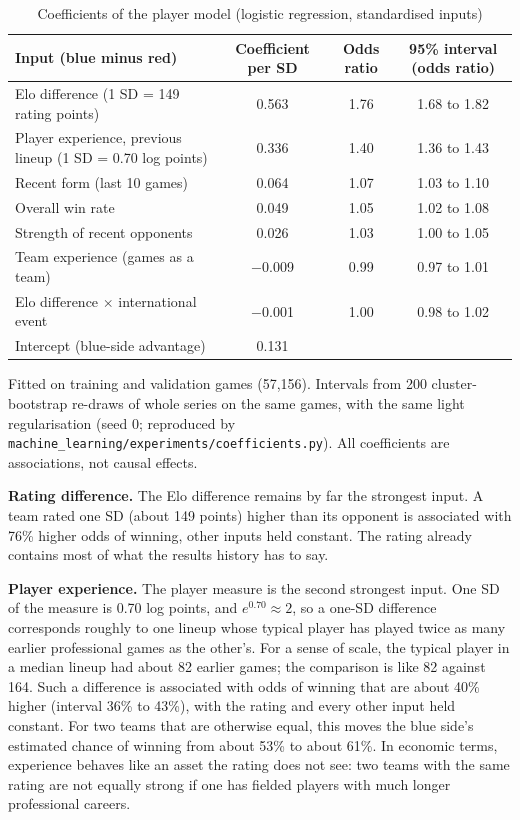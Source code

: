 \documentclass[12pt,a4paper]{article}
\begin{document}
\begin{table}[H]
\centering\small
\begin{threeparttable}
\caption{Coefficients of the player model (logistic regression, standardised inputs)}\label{tab:coef}
\begin{tabularx}{\linewidth}{@{}Yccc@{}}
\toprule
Input (blue minus red) & Coefficient per SD & Odds ratio & 95\% interval (odds ratio) \\
\midrule
Elo difference (1 SD = 149 rating points) & 0.563 & 1.76 & 1.68 to 1.82 \\
Player experience, previous lineup (1 SD = 0.70 log points) & 0.336 & 1.40 & 1.36 to 1.43 \\
Recent form (last 10 games) & 0.064 & 1.07 & 1.03 to 1.10 \\
Overall win rate & 0.049 & 1.05 & 1.02 to 1.08 \\
Strength of recent opponents & 0.026 & 1.03 & 1.00 to 1.05 \\
Team experience (games as a team) & $-$0.009 & 0.99 & 0.97 to 1.01 \\
Elo difference $\times$ international event & $-$0.001 & 1.00 & 0.98 to 1.02 \\
\midrule
Intercept (blue-side advantage) & 0.131 & & \\
\bottomrule
\end{tabularx}
\begin{tablenotes}\footnotesize
\item Fitted on training and validation games (57,156). Intervals from 200 cluster-bootstrap re-draws of whole series on the same games, with the same light regularisation (seed 0; reproduced by \texttt{machine\_learning/experiments/coefficients.py}). All coefficients are associations, not causal effects.
\end{tablenotes}
\end{threeparttable}
\end{table}

\textbf{Rating difference.} The Elo difference remains by far the strongest input. A team rated one SD (about 149 points) higher than its opponent is associated with 76\% higher odds of winning, other inputs held constant. The rating already contains most of what the results history has to say.

\textbf{Player experience.} The player measure is the second strongest input. One SD of the measure is 0.70 log points, and $e^{0.70} \approx 2$, so a one-SD difference corresponds roughly to one lineup whose typical player has played twice as many earlier professional games as the other's. For a sense of scale, the typical player in a median lineup had about 82 earlier games; the comparison is like 82 against 164. Such a difference is associated with odds of winning that are about 40\% higher (interval 36\% to 43\%), with the rating and every other input held constant. For two teams that are otherwise equal, this moves the blue side's estimated chance of winning from about 53\% to about 61\%. In economic terms, experience behaves like an asset the rating does not see: two teams with the same rating are not equally strong if one has fielded players with much longer professional careers.
\end{document}
